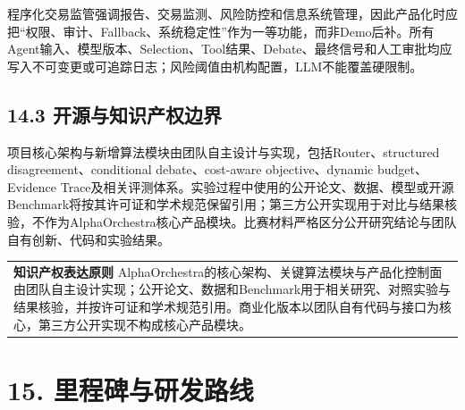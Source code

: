 \documentclass[12pt,a4paper]{ctexart}
\begin{document}
程序化交易监管强调报告、交易监测、风险防控和信息系统管理，因此产品化时应把``权限、审计、Fallback、系统稳定性''作为一等功能，而非Demo后补。所有Agent输入、模型版本、Selection、Tool结果、Debate、最终信号和人工审批均应写入不可变更或可追踪日志；风险阈值由机构配置，LLM不能覆盖硬限制。

\subsection{\texorpdfstring{\textbf{14.3
开源与知识产权边界}}{14.3 开源与知识产权边界}}\label{ux5f00ux6e90ux4e0eux77e5ux8bc6ux4ea7ux6743ux8fb9ux754c}

项目核心架构与新增算法模块由团队自主设计与实现，包括Router、structured
disagreement、conditional debate、cost-aware objective、dynamic
budget、Evidence
Trace及相关评测体系。实验过程中使用的公开论文、数据、模型或开源Benchmark将按其许可证和学术规范保留引用；第三方公开实现用于对比与结果核验，不作为AlphaOrchestra核心产品模块。比赛材料严格区分公开研究结论与团队自有创新、代码和实验结果。

\begin{longtable}[]{@{}
  >{\raggedright\arraybackslash}p{}@{}}
\toprule\noalign{}
\endhead
\bottomrule\noalign{}
\endlastfoot
\textbf{知识产权表达原则}
AlphaOrchestra的核心架构、关键算法模块与产品化控制面由团队自主设计实现；公开论文、数据和Benchmark用于相关研究、对照实验与结果核验，并按许可证和学术规范引用。商业化版本以团队自有代码与接口为核心，第三方公开实现不构成核心产品模块。 \\
\end{longtable}

\section{\texorpdfstring{\textbf{15.
里程碑与研发路线}}{15. 里程碑与研发路线}}\label{ux91ccux7a0bux7891ux4e0eux7814ux53d1ux8defux7ebf}
\end{document}
